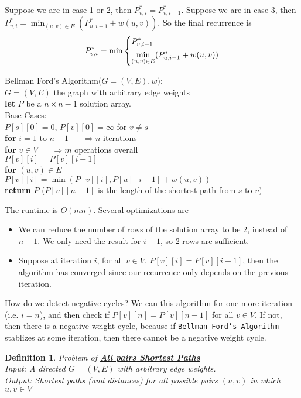 \documentclass[twoside]{article}
\newcommand{\pc}[1]{\mbox{\textbf{#1}}} %
\newtheorem{protodefinition}[prototheorem]{Definition}
\newenvironment{definition}
{\colorlet{shadecolor}{cyan!15}\begin{shaded}\begin{protodefinition}\normalfont}
		{\end{protodefinition}\end{shaded}}
\begin{document}
Suppose we are in case 1 or 2, then $P^*_{v, i} = P^*_{v, i-1}$. Suppose we are in case 3, then $P^*_{v, i} = \min_{(u, v)\in E} (P^*_{u, i-1} + w(u, v))$. So the final recurrence is $$P^*_{v, i} = \min \begin{dcases}
P^*_{v, i-1}\\
\min_{(u, v)\in E} (P^*_{u, i-1} + w(u, v))
\end{dcases}$$
\begin{algorithme}
	Bellman Ford's Algorithm($G = (V, E), w$): \\
	$G = (V, E)$ the graph with arbitrary edge weights\\
	\>\pc{let} $P$ be a $n \times n-1$ solution array. \\
	\>Base Cases: \\
	\>$P[s][0] = 0$, $P[v][0] = \infty$ for $v \neq s$\\
	\>\pc{for} $i = 1$ to $n-1$ $\;\;\;\;\;\Rightarrow n$ iterations\\
	\>\>\pc{for} $v \in V$ $\;\;\;\;\;\Rightarrow m$ operations overall\\
	\>\>\>$P[v][i] = P[v][i-1]$\\
	\>\>\>\pc{for} $(u, v) \in E$\\
	\>\>\>\>$P[v][i] = \min(P[v][i], P[u][i-1]+w(u,v))$\\
	\>\pc{return} $P$ ($P[v][n-1]$ is the length of the shortest path from $s$ to $v$) 
\end{algorithme}

The runtime is $O(mn)$. Several optimizations are \begin{itemize}
\item We can reduce the number of rows of the solution array to be 2, instead of $n-1$. We only need the result for $i-1$, so 2 rows are sufficient. 
\item Suppose at iteration $i$, for all $v \in V$, $P[v][i] = P[v][i-1]$, then the algorithm has converged since our recurrence only depends on the previous iteration. 
\end{itemize}

How do we detect negative cycles? We can this algorithm for one more iteration (i.e. $i = n$), and then check if $P[v][n] = P[v][n-1]$ for all $v \in V$. If not, then there is a negative weight cycle, because if \texttt{Bellman Ford's Algorithm} stablizes at some iteration, then there cannot be a negative weight cycle. 

\begin{definition}
	Problem of \textbf{\underline{All pairs Shortest Paths}}\\
	Input: A directed $G = (V, E)$ with arbitrary edge weights. \\
	Output: Shortest paths (and distances) for all possible pairs $(u, v)$ in which $u,v \in V$
\end{definition}
\end{document}

